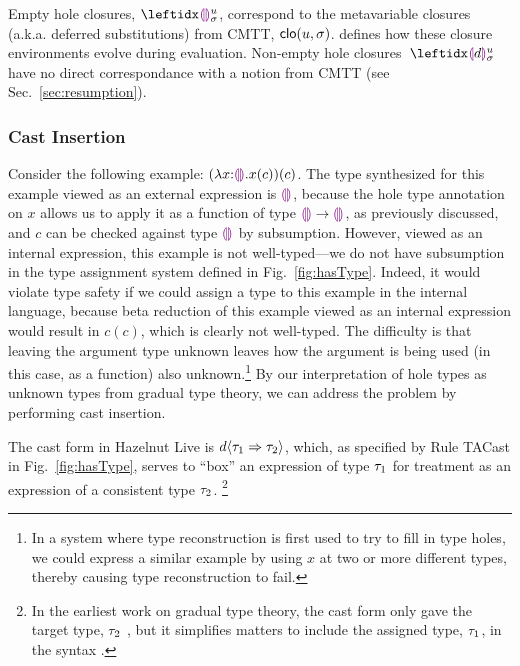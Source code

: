 Empty hole closures, $\dehole{u}{\sigma}{}$,  correspond to the metavariable closures (a.k.a. deferred substitutions) from CMTT, $\mathsf{clo}(u, \sigma)$.
%
 defines how these closure environments evolve during evaluation.
%
Non-empty hole closures~$\dhole{d}{u}{\sigma}{}$ have no direct correspondance with a notion from CMTT (see Sec.~\ref{sec:resumption}).


\subsubsection{Cast Insertion}\label{sec:cast-insertion} 
%
Consider the following example: $(\lambda x{:}\textcolor{violet}{\llparenthesis}\textcolor{violet}{\rrparenthesis}.x(c))(c)$. 
The type synthesized for this example viewed as an external expression is $\textcolor{violet}{\llparenthesis}\textcolor{violet}{\rrparenthesis}$, because the hole type annotation on $x$ allows us to apply it as a function of type $\textcolor{violet}{\llparenthesis}\textcolor{violet}{\rrparenthesis} \rightarrow \textcolor{violet}{\llparenthesis}\textcolor{violet}{\rrparenthesis}$, as previously discussed, and $c$ can be checked against type $\textcolor{violet}{\llparenthesis}\textcolor{violet}{\rrparenthesis}$ by subsumption. 
However, viewed as an internal expression, this example is not well-typed---we do not have subsumption in the type assignment system defined in Fig.~\ref{fig:hasType}. 
Indeed, it would violate type safety if we could assign a type to this example in the internal language, because beta reduction of this example viewed as an internal expression would result in $c(c)$, which is clearly not well-typed.
The difficulty is that leaving the argument type unknown leaves how the argument is being used (in this case, as a function) also unknown.\footnote{In a system where type reconstruction is first used to try to fill in type holes, we could express a similar example by using $x$ at two or more different types, thereby causing type reconstruction to fail.
}
By our  interpretation of hole types as unknown types from gradual type theory, we can address the problem by performing cast insertion. 
%

The cast form in Hazelnut Live is $d \langle{\tau_1}\Rightarrow{\tau_2}\rangle$, which, as specified by Rule TACast in Fig.~\ref{fig:hasType}, serves to ``box'' an expression of type $\tau_1$ for treatment as an expression of a consistent type $\tau_2$.%
\footnote{In the earliest work on gradual type theory, the cast form only gave the target type, $\tau_2$ \cite{Siek06a}, but it simplifies matters to include the assigned type, $\tau_1$, in the syntax \cite{DBLP:conf/snapl/SiekVCB15}.}

